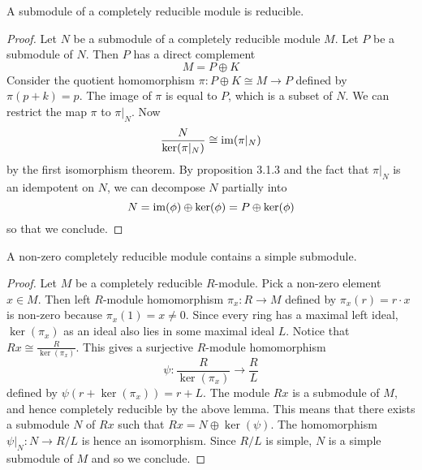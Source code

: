 \documentclass[a4paper]{article}
\begin{document}
\begin{lmm}{}{} A submodule of a completely reducible module is reducible. 
\begin{proof}
Let $N$ be a submodule of a completely reducible module $M$. Let $P$ be a submodule of $N$. Then $P$ has a direct complement $$M=P\oplus K$$ Consider the quotient homomorphism $\pi:P\oplus K\cong M\to P$ defined by $\pi(p+k)=p$. The image of $\pi$ is equal to $P$, which is a subset of $N$. We can restrict the map $\pi$ to $\pi|_N$. Now $$\frac{N}{\ker(\pi|_N)}\cong\operatorname{im}(\pi|_N)$$ by the first isomorphism theorem. By proposition 3.1.3 and the fact that $\pi|_N$ is an idempotent on $N$, we can decompose $N$ partially into $$N=\operatorname{im}(\phi)\oplus\ker(\phi)=P\oplus\ker(\phi)$$ so that we conclude. 
\end{proof}
\end{lmm}

\begin{lmm}{}{} A non-zero completely reducible module contains a simple submodule. 
\begin{proof}
Let $M$ be a completely reducible $R$-module. Pick a non-zero element $x\in M$. Then left $R$-module homomorphism $\pi_x:R\to M$ defined by $\pi_x(r)=r\cdot x$ is non-zero because $\pi_x(1)=x\neq 0$. Since every ring has a maximal left ideal, $\ker(\pi_x)$ as an ideal also lies in some maximal ideal $L$. Notice that $Rx\cong\frac{R}{\ker(\pi_x)}$. This gives a surjective $R$-module homomorphism $$\psi:\frac{R}{\ker(\pi_x)}\to\frac{R}{L}$$ defined by $\psi(r+\ker(\pi_x))=r+L$. The module $Rx$ is a submodule of $M$, and hence completely reducible by the above lemma. This means that there exists a submodule $N$ of $Rx$ such that $Rx=N\oplus\ker(\psi)$. The homomorphism $\psi|_N:N\to R/L$ is hence an isomorphism. Since $R/L$ is simple, $N$ is a simple submodule of $M$ and so we conclude. 
\end{proof}
\end{lmm}
\end{document}
